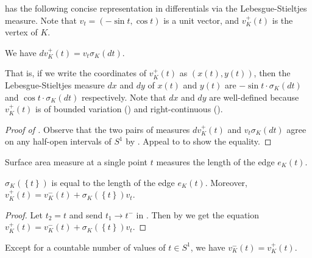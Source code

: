  has the following concise representation in differentials via the Lebesgue-Stieltjes measure. Note that \(v_t = (-\sin t, \cos t)\) is a unit vector, and \(v_K^+(t)\) is the vertex of \(K\).

\begin{proposition}

We have \(dv_K^+(t) = v_t \sigma_K(dt)\).

\label{pro:boundary-measure-differential}
\end{proposition}

That is, if we write the coordinates of \(v_K^+(t)\) as \((x(t), y(t))\), then the Lebesgue-Stieltjes measure \(dx\) and \(dy\) of \(x(t)\) and \(y(t)\) are \(-\sin t \cdot \sigma_K(dt)\) and \(\cos t \cdot \sigma_K(dt)\) respectively. Note that \(dx\) and \(dy\) are well-defined because \(v_K^+(t)\) is of bounded variation () and right-continuous ().

\begin{proof}[Proof of ]
Observe that the two pairs of measures \(dv_K^+(t)\) and \(v_t \sigma_K(dt)\) agree on any half-open intervals of \(S^1\) by . Appeal to  to show the equality.
\end{proof}

Surface area measure at a single point \(t\) measures the length of the edge \(e_K(t)\).

\begin{theorem}

\(\sigma_K(\left\{ t \right\})\) is equal to the length of the edge \(e_K(t)\). Moreover, \(v_K^+(t) = v_K^-(t) + \sigma_K( \left\{ t \right\} ) v_t\).

\label{thm:surface-area-singleton}
\end{theorem}

\begin{proof}
Let \(t_2 = t\) and send \(t_1 \to t^-\) in . Then by  we get the equation \(v_K^+(t) = v_K^-(t) + \sigma_K(\left\{ t \right\}) v_t\).
\end{proof}

\begin{proposition}

Except for a countable number of values of \(t \in S^1\), we have \(v_K^-(t) = v_K^+(t)\).

\label{pro:surface-area-singleton-almost-everywhere}
\end{proposition}

